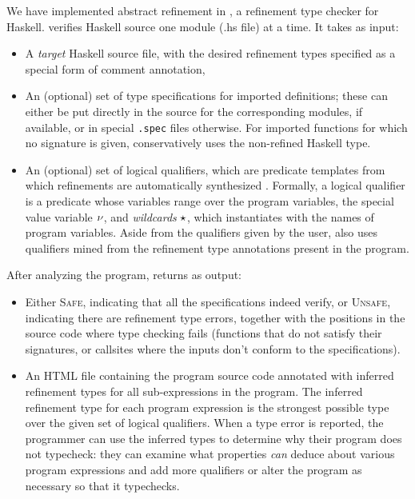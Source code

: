 \mypara{\toolname} We have implemented abstract refinement 
in \toolname, a refinement type checker for Haskell.
\toolname verifies Haskell source one module (.hs file) at a time. 
It takes as input:
\begin{itemize}
\item A \emph{target} Haskell source file, with the desired refinement
types specified as a special form of comment annotation, 
\item An (optional) set of type specifications for imported definitions; these 
can either be put directly in the source for the corresponding modules,
if available, or in special \verb+.spec+ files otherwise. For imported 
functions for which no signature is given, \toolname conservatively uses 
the non-refined  Haskell type. %
\item An (optional) set of logical qualifiers, which are predicate 
templates from which refinements are automatically synthesized
\cite{LiquidPLDI08}.
%
Formally, a logical qualifier is a predicate whose variables range
over the program variables, the special value variable $\nu$, and
\emph{wildcards} $\star$, which \toolname instantiates with the
names of program variables.
%
Aside from the qualifiers given by the user, \toolname also uses
qualifiers mined from the refinement type annotations present in the
program.
\end{itemize}
After analyzing the program, \toolname returns as output:
\begin{itemize}
\item Either \textsc{Safe}, indicating that all the specifications indeed
verify, or \textsc{Unsafe}, indicating there are refinement type errors,
together with the positions in the source code where type checking fails
(\eg functions that do not satisfy their signatures, or callsites where 
the inputs don't conform to the specifications).
%
\item
%
  An HTML file containing the program source code annotated with
  inferred refinement types for all sub-expressions in the program.
%
  The inferred refinement type for each program expression is the
  strongest possible type over the given set of logical qualifiers.
%
  When a type error is reported, the programmer can use the inferred
  types to determine why their program does not typecheck:
  they can examine what properties \toolname \emph{can} deduce about 
  various program expressions and add more qualifiers or alter 
  the program as necessary so that it typechecks.
%
\end{itemize}

